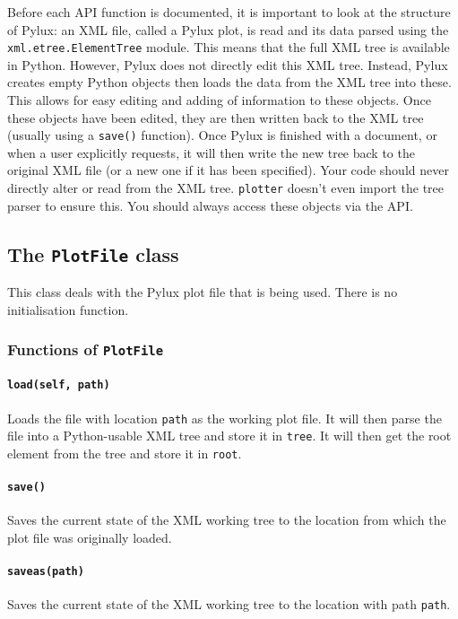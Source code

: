 \documentclass[a4paper]{article}
\begin{document}
Before each API function is documented, it is important to look at the 
structure of Pylux: an XML file, called a Pylux plot, is read and its data 
parsed using the \texttt{xml.etree.ElementTree} module. This means that the 
full XML tree is available in Python. However, Pylux does not directly edit 
this XML tree. Instead, Pylux creates empty Python objects then loads the 
data from the XML tree into these. This allows for easy editing and adding of 
information to these objects. Once these objects have been edited, they are 
then written back to the XML tree (usually using a \texttt{save()} function). 
Once Pylux is finished with a document, or when a user explicitly requests, 
it will then write the new tree back to the original XML file (or a new one if 
it has been specified). Your code should never directly alter or read from 
the XML tree. \texttt{plotter} doesn't even import the tree parser to ensure 
this. You should always access these objects via the API.

\subsection{The \texttt{PlotFile} class}
This class deals with the Pylux plot file that is being used. There is no 
initialisation function.

\subsubsection{Functions of \texttt{PlotFile}}

\paragraph{\texttt{load(self, path)}}
Loads the file with location \texttt{path} as the working plot file. It will 
then parse the file into a Python-usable XML tree and store it in 
\texttt{tree}. It will then get the root element from the tree and store it in 
\texttt{root}.

\paragraph{\texttt{save()}}
Saves the current state of the XML working tree to the location from which 
the plot file was originally loaded.

\paragraph{\texttt{saveas(path)}}
Saves the current state of the XML working tree to the location with path 
\texttt{path}.
\end{document}

